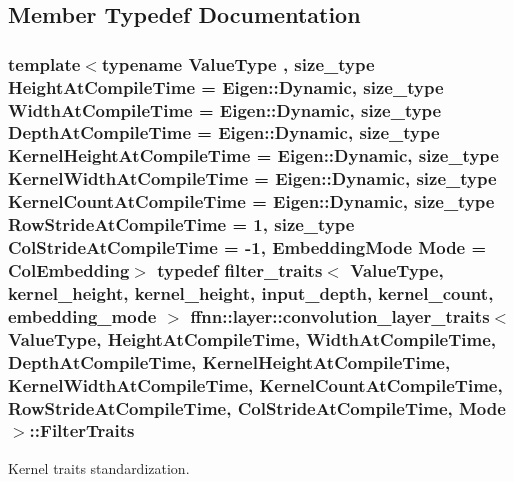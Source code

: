 \subsection{Member Typedef Documentation}
\hypertarget{structffnn_1_1layer_1_1convolution__layer__traits_acea1d4d335c6bfe4151ac326f1a341de}{
\subsubsection[{Filter\-Traits}]{\setlength{\rightskip}{0pt plus 5cm}template$<$typename Value\-Type , size\-\_\-type Height\-At\-Compile\-Time = Eigen\-::\-Dynamic, size\-\_\-type Width\-At\-Compile\-Time = Eigen\-::\-Dynamic, size\-\_\-type Depth\-At\-Compile\-Time = Eigen\-::\-Dynamic, size\-\_\-type Kernel\-Height\-At\-Compile\-Time = Eigen\-::\-Dynamic, size\-\_\-type Kernel\-Width\-At\-Compile\-Time = Eigen\-::\-Dynamic, size\-\_\-type Kernel\-Count\-At\-Compile\-Time = Eigen\-::\-Dynamic, size\-\_\-type Row\-Stride\-At\-Compile\-Time = 1, size\-\_\-type Col\-Stride\-At\-Compile\-Time = -\/1, Embedding\-Mode Mode = Col\-Embedding$>$ typedef filter\-\_\-traits$<$ Value\-Type, {\bf kernel\-\_\-height}, {\bf kernel\-\_\-height}, {\bf input\-\_\-depth}, {\bf kernel\-\_\-count}, {\bf embedding\-\_\-mode} $>$ {\bf ffnn\-::layer\-::convolution\-\_\-layer\-\_\-traits}$<$ Value\-Type, Height\-At\-Compile\-Time, Width\-At\-Compile\-Time, Depth\-At\-Compile\-Time, Kernel\-Height\-At\-Compile\-Time, Kernel\-Width\-At\-Compile\-Time, Kernel\-Count\-At\-Compile\-Time, Row\-Stride\-At\-Compile\-Time, Col\-Stride\-At\-Compile\-Time, Mode $>$\-::{\bf Filter\-Traits}}}\label{structffnn_1_1layer_1_1convolution__layer__traits_acea1d4d335c6bfe4151ac326f1a341de}


Kernel traits standardization. 

